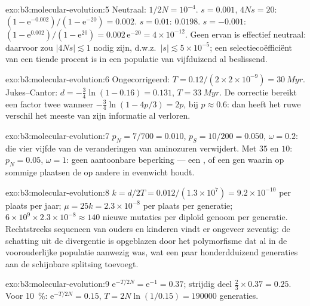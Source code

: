 \begin{solution}{exo:b3:molecular-evolution:5}
Neutraal: $1/2N = 10^{-4}$. $s = 0.001$, $4Ns = 20$: $(1 - \mathrm{e}^{-0.002})/
(1 - \mathrm{e}^{-20}) = 0.002$. $s = 0.01$: $0.0198$. $s = -0.001$: $(1 -
\mathrm{e}^{0.002})/(1 - \mathrm{e}^{20}) = 0.002\,\mathrm{e}^{-20} =
4\times 10^{-12}$. Geen ervan is effectief neutraal: daarvoor zou
$|4Ns|
\lesssim 1$ nodig zijn, d.w.z.\ $|s| \lesssim 5\times 10^{-5}$; een
selectiecoëfficiënt van een tiende procent is in een populatie van
vijfduizend al beslissend.
\end{solution}

\begin{solution}{exo:b3:molecular-evolution:6}
Ongecorrigeerd: $T = 0.12/(2\times 2\times 10^{-9}) = \qty{30}{Myr}$.
Jukes--Cantor: $d = -\tfrac{3}{4}\ln(1 - 0.16) = 0.131$, $T =
\qty{33}{Myr}$. De correctie bereikt een factor twee wanneer $-\tfrac{3}{4}
\ln(1 - 4p/3) = 2p$, bij $p \approx 0.6$: dan heeft het ruwe verschil
het meeste van zijn informatie al verloren.
\end{solution}

\begin{solution}{exo:b3:molecular-evolution:7}
$p_{N} = 7/700 = 0.010$, $p_{S} = 10/200 = 0.050$, $\omega = 0.2$:
 die vier vijfde van de veranderingen van aminozuren
verwijdert. Met $35$ en $10$: $p_{N} = 0.05$, $\omega = 1$: geen
aantoonbare beperking --- een , of een gen waarin  op sommige plaatsen de  op andere in
evenwicht houdt.
\end{solution}

\begin{solution}{exo:b3:molecular-evolution:8}
$k = d/2T = 0.012/(1.3\times 10^{7}) = 9.2\times 10^{-10}$ per plaats
per jaar; $\mu = 25k = 2.3\times 10^{-8}$ per plaats per generatie;
$6\times
10^{9}\times 2.3\times 10^{-8} \approx 140$ nieuwe mutaties per diploïd
genoom per generatie. Rechtstreeks sequencen van ouders en kinderen
vindt er ongeveer zeventig: de schatting uit de divergentie is
opgeblazen door het polymorfisme dat al in de voorouderlijke populatie
aanwezig was, wat een paar honderdduizend generaties aan de schijnbare
splitsing toevoegt.
\end{solution}

\begin{solution}{exo:b3:molecular-evolution:9}
$\mathrm{e}^{-T/2N} = \mathrm{e}^{-1} = 0.37$; strijdig deel $\tfrac{2}{3}
\times 0.37 = 0.25$. Voor \qty{10}{\%}: $\mathrm{e}^{-T/2N} = 0.15$, $T =
2N\ln(1/0.15) = \num{190000}$ generaties.
\end{solution}

